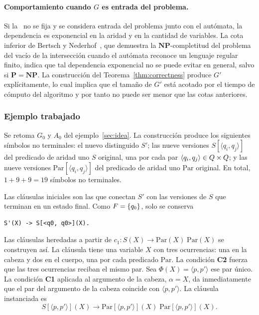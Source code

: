 \paragraph{Comportamiento cuando \texorpdfstring{$G$}{G} es entrada del problema.} Si la \PRCG\ no se fija y se considera entrada del problema junto con el autómata, la dependencia es exponencial en la aridad y en la cantidad de variables. La cota inferior de Bertsch y Nederhof~\cite{REF}, que demuestra la $\mathbf{NP}$-completitud del problema del vacío de la intersección cuando el autómata reconoce un lenguaje regular finito, indica que tal dependencia exponencial no se puede evitar en general, salvo si $\mathbf{P} = \mathbf{NP}$. La construcción del Teorema~\ref{thm:correctness} produce $G'$ explícitamente, lo cual implica que el tamaño de $G'$ está acotado por el tiempo de cómputo del algoritmo y por tanto no puede ser menor que las cotas anteriores.

\subsubsection{Ejemplo trabajado}

Se retoma $G_0$ y $A_0$ del ejemplo~\ref{sec:idea}. La construcción produce los siguientes símbolos no terminales: el nuevo distinguido $S'$; las nueve versiones $S[\langle q_i, q_j \rangle]$ del predicado de aridad uno $S$ original, una por cada par $\langle q_i, q_j \rangle \in Q \times Q$; y las nueve versiones $\mathrm{Par}[\langle q_i, q_j \rangle]$ del predicado de aridad uno $\mathrm{Par}$ original. En total, $1 + 9 + 9 = 19$ símbolos no terminales.

Las cláusulas iniciales son las que conectan $S'$ con las versiones de $S$ que terminan en un estado final. Como $F = \{q_0\}$, solo se conserva
\begin{Verbatim}[xleftmargin=2em]
  S'(X) -> S[<q0, q0>](X).
\end{Verbatim}

Las cláusulas heredadas a partir de $c_1 : S(X) \to \mathrm{Par}(X) \; \mathrm{Par}(X)$ se construyen así. La cláusula tiene una variable $X$ con tres ocurrencias: una en la cabeza y dos en el cuerpo, una por cada predicado $\mathrm{Par}$. La condición \textbf{C2} fuerza que las tres ocurrencias reciban el mismo par. Sea $\Phi(X) = \langle p, p' \rangle$ ese par único. La condición \textbf{C1} aplicada al argumento de la cabeza, $\alpha = X$, da inmediatamente que el par del argumento de la cabeza coincide con $\langle p, p' \rangle$. La cláusula instanciada es
\[
S[\langle p, p' \rangle](X) \to \mathrm{Par}[\langle p, p' \rangle](X) \; \mathrm{Par}[\langle p, p' \rangle](X).
\]

